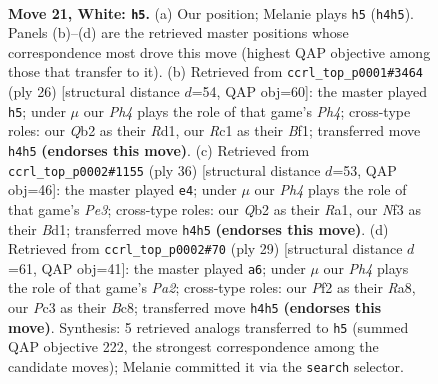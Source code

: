 \documentclass[11pt]{article}
\begin{document}
\clearpage

\begin{figure}[p]\centering
\begin{subfigure}{0.46\textwidth}\centering
\resizebox{\linewidth}{!}{%
\newchessgame
\chessboard[
  setfen={1r1r2k1/1p1bqppp/2n1p3/2Pp4/p2P3P/P1P2N2/RQ2BPP1/2R3K1 w - - 0 21},
  showmover=false,
  pgfstyle=straightmove, color=movearrow, markmove={h4-h5}
]}
\caption{}
\end{subfigure}\hfill
\begin{subfigure}{0.46\textwidth}\centering
\resizebox{\linewidth}{!}{%
\newchessgame
\chessboard[
  setfen={r4r1k/pppbqppp/3p1n2/8/2P1P2P/2N1QP2/PP3P2/2KR1B1R w - - 1 14},
  showmover=false,
  pgfstyle=straightmove, color=movearrow, markmove={h4-h5}
]}
\caption{}
\end{subfigure}
\\[4pt]
\begin{subfigure}{0.46\textwidth}\centering
\resizebox{\linewidth}{!}{%
\newchessgame
\chessboard[
  setfen={4rrk1/pb1n1pp1/1pppq2p/8/2P2P2/P1Q1P3/1P1N2PP/R2B1RK1 w - - 1 19},
  showmover=false,
  pgfstyle=straightmove, color=movearrow, markmove={e3-e4}
]}
\caption{}
\end{subfigure}\hfill
\begin{subfigure}{0.46\textwidth}\centering
\resizebox{\linewidth}{!}{%
\newchessgame
\chessboard[
  setfen={r1b1r1k1/pp1nqpp1/2p4p/4p3/1P1P4/2Q1PN2/P3BPPP/2R2RK1 b - - 0 15},
  showmover=false,
  pgfstyle=straightmove, color=movearrow, markmove={a7-a6}
]}
\caption{}
\end{subfigure}
\caption{\textbf{Move 21, White: \texttt{h5}.} (a) Our position; Melanie plays \texttt{h5} (\texttt{h4h5}). Panels (b)--(d) are the retrieved master positions whose correspondence most drove this move (highest QAP objective among those that transfer to it). (b) Retrieved from \texttt{ccrl\_top\_p0001\#3464} (ply 26) [structural distance $d$=54, QAP obj=60]: the master played \texttt{h5}; under $\mu$ our \emph{Ph4} plays the role of that game's \emph{Ph4}; cross-type roles: our \emph{Q}b2 as their \emph{R}d1, our \emph{R}c1 as their \emph{B}f1; transferred move \texttt{h4h5} \textbf{(endorses this move)}. (c) Retrieved from \texttt{ccrl\_top\_p0002\#1155} (ply 36) [structural distance $d$=53, QAP obj=46]: the master played \texttt{e4}; under $\mu$ our \emph{Ph4} plays the role of that game's \emph{Pe3}; cross-type roles: our \emph{Q}b2 as their \emph{R}a1, our \emph{N}f3 as their \emph{B}d1; transferred move \texttt{h4h5} \textbf{(endorses this move)}. (d) Retrieved from \texttt{ccrl\_top\_p0002\#70} (ply 29) [structural distance $d$=61, QAP obj=41]: the master played \texttt{a6}; under $\mu$ our \emph{Ph4} plays the role of that game's \emph{Pa2}; cross-type roles: our \emph{P}f2 as their \emph{R}a8, our \emph{P}c3 as their \emph{B}c8; transferred move \texttt{h4h5} \textbf{(endorses this move)}. Synthesis: 5 retrieved analogs transferred to \texttt{h5} (summed QAP objective 222, the strongest correspondence among the candidate moves); Melanie committed it via the \texttt{search} selector.}
\label{fig:thought-m40}
\end{figure}
\end{document}
